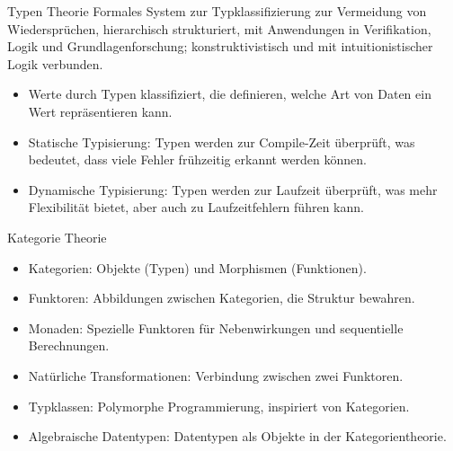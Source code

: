 \documentclass{beamer}
\begin{document}
\begin{frame}{ Typen Theorie}
 \textmd{Formales System zur Typklassifizierung zur Vermeidung von Wiedersprüchen, hierarchisch strukturiert, mit Anwendungen in Verifikation, Logik und Grundlagenforschung; konstruktivistisch und mit intuitionistischer Logik verbunden.}
\begin{itemize}
\item Werte durch Typen klassifiziert, die definieren, welche Art von Daten ein Wert repräsentieren kann.
\item Statische Typisierung: Typen werden zur Compile-Zeit überprüft, was bedeutet, dass viele Fehler frühzeitig erkannt werden können.
\item Dynamische Typisierung: Typen werden zur Laufzeit überprüft, was mehr Flexibilität bietet, aber auch zu Laufzeitfehlern führen kann. 
\end{itemize}

\end{frame}

\begin{frame}{Kategorie Theorie}
	\begin{itemize}
\item Kategorien: Objekte (Typen) und Morphismen (Funktionen).
\item Funktoren: Abbildungen zwischen Kategorien, die Struktur bewahren.
\item Monaden: Spezielle Funktoren für Nebenwirkungen und sequentielle Berechnungen.
\item Natürliche Transformationen: Verbindung zwischen zwei Funktoren.
\item Typklassen: Polymorphe Programmierung, inspiriert von Kategorien.
\item Algebraische Datentypen: Datentypen als Objekte in der Kategorientheorie.
\end{itemize}
\end{frame}
\end{document}

